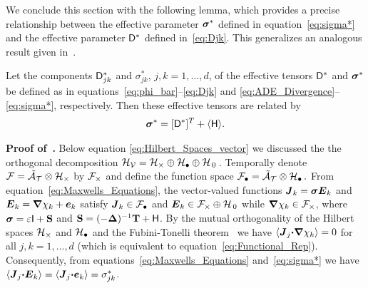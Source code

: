 \documentclass[amsa]{ipart}
\begin{document}
We conclude this section with the following lemma, which provides
a precise relationship between the effective parameter $\mbox{\boldmath${\sigma}$}^*$
defined in equation~\eqref{eq:sigma*} and the effective parameter
$\mathsf{D}^*$ defined in~\eqref{eq:Djk}. This generalizes an analogous
result given in~\cite{Fannjiang:1994:SIAM_JAM:333}. 
%
\begin{lemma}\label{lem:kappa_sigma}
%
Let the components $\mathsf{D}^*_{jk}$ and $\sigma^*_{jk}$, $j,k=1,\ldots,d$, of the
effective tensors $\mathsf{D}^*$ and $\mbox{\boldmath${\sigma}$}^*$ be defined as in
equations~\eqref{eq:phi_bar}--\eqref{eq:Djk} and
\eqref{eq:ADE_Divergence}--\eqref{eq:sigma*}, respectively. Then  
these effective tensors are related by 
% 
\begin{align}\label{eq:Eff_Equiv}
  \bsig^*=[\Dm^*]^T+\langle\Hm\rangle.
\end{align}
%
\end{lemma}
%
%
\textbf{Proof of~.}\hspace{1ex}
%
Below equation \eqref{eq:Hilbert_Spaces_vector} we discussed the
the orthogonal decomposition
$\mathcal{H}_{\mathcal{V}}=\mathcal{H}_\times\oplus\mathcal{H}_\bullet\oplus\mathcal{H}_{\,0}\,$. Temporally denote
$\mathcal{F}=\tilde{\mathcal{A}}_{\mathcal{T}}\otimes\mathcal{H}_\times$ by $\mathcal{F}_\times$ and define the function
space $\mathcal{F}_\bullet=\tilde{\mathcal{A}}_{\mathcal{T}}\otimes\mathcal{H}_\bullet\,.$ From
equation~\eqref{eq:Maxwells_Equations}, the vector-valued functions
$\boldsymbol{J}_k=\mbox{\boldmath${\sigma}$}\boldsymbol{E}_k$ and $\boldsymbol{E}_k=\mbox{\boldmath${\nabla}$} \chi_k+\boldsymbol{e}_k$ satisfy 
$\boldsymbol{J}_k\in\mathcal{F}_\bullet$ and $\boldsymbol{E}_k\in\mathcal{F}_\times\oplus\mathcal{H}_{\,0}$ while
$\mbox{\boldmath${\nabla}$}\chi_k\in\mathcal{F}_\times$, where $\mbox{\boldmath${\sigma}$}=\varepsilon\mathsf{I}+\mathbf{S}$ and 
$\mathbf{S}=(-\mbox{\boldmath${\Delta}$})^{-1}\mathbf{T}+\mathsf{H}$. By the mutual orthogonality of the 
Hilbert spaces $\mathcal{H}_\times$ and $\mathcal{H}_\bullet$ and the
Fubini-Tonelli theorem~\cite{Folland:99:RealAnalysis} we have
$\langle\boldsymbol{J}_j\mbox{\boldmath${\cdot}$}\mbox{\boldmath${\nabla}$}\chi_k\rangle=0$ for all $j,k=1,\ldots,d$ (which is equivalent
to equation~\eqref{eq:Functional_Rep}). Consequently, from
equations~\eqref{eq:Maxwells_Equations} and~\eqref{eq:sigma*} we have 
$\langle\boldsymbol{J}_j\mbox{\boldmath${\cdot}$}\boldsymbol{E}_k\rangle=\langle\boldsymbol{J}_j\mbox{\boldmath${\cdot}$}\boldsymbol{e}_k\rangle=\sigma^*_{jk}$.  
\end{document}
